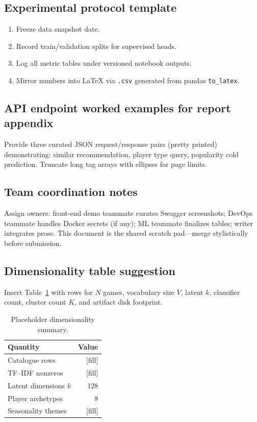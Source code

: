 \subsection{Experimental protocol template}
\begin{enumerate}
\item Freeze data snapshot date.
\item Record train/validation splits for supervised heads.
\item Log all metric tables under versioned notebook outputs.
\item Mirror numbers into LaTeX via \texttt{.csv} generated from pandas \texttt{to\_latex}.
\end{enumerate}

\subsection{API endpoint worked examples for report appendix}
Provide three curated JSON request/response pairs (pretty printed) demonstrating: similar recommendation, player type query, popularity cold prediction. Truncate long tag arrays with ellipses for page limits.

\subsection{Team coordination notes}
Assign owners: front-end demo teammate curates Swagger screenshots; DevOps teammate handles Docker secrets (if any); ML teammate finalizes tables; writer integrates prose. This document is the shared scratch pad---merge stylistically before submission.

\subsection{Dimensionality table suggestion}
Insert Table~\ref{tab:dim-placeholder} with rows for $N$ games, vocabulary size $V$, latent $k$, classifier count, cluster count $K$, and artifact disk footprint.

\begin{table}[t]
\caption{Placeholder dimensionality summary.\label{tab:dim-placeholder}}
\centering
\begin{tabular}{@{}l r@{}}\toprule
Quantity & Value \\\midrule
Catalogue rows & [fill] \\
TF--IDF nonzeros & [fill] \\
Latent dimensions $k$ & 128 \\
Player archetypes & 8 \\
Seasonality themes & [fill] \\\bottomrule
\end{tabular}
\end{table}

